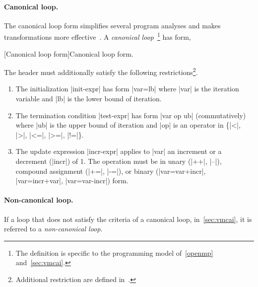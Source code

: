 \paragraph*{Canonical loop.}
The canonical loop form simplifies several program analyses and makes transformations more effective~\cite{llvm_loops}.
A \emph{canonical loop}~\cite[p. 196--202]{openmp_api}\footnote{
The definition is specific to the programming model of~\autoref{openmp} and~\autoref{sec:vmcai}.} has form,
\begin{center}
\begin{minipage}{\textwidth}
[Canonical loop form]{Canonical loop form.}
\label{lst:canonical}
\end{minipage}
\end{center}
The header must additionally satisfy the following restrictions\footnote{
Additional restriction are defined in~\cite[p. 201]{openmp_api}.}.
\begin{enumerate}
\item The initialization \pr|init-expr| has form \pr|var=lb| where \pr|var| is the iteration variable and \pr|lb| is the lower bound of iteration.
\item The termination condition \pr|test-expr| has form \pr|var op ub| (commutatively)
    where \pr|ub| is the upper bound of iteration and \pr|op| is an operator in \{\pr|<|, \pr|>|, \pr|<=|, \pr|>=|, \pr|!=|\}.
\item The update expression \pr|incr-expr| applies to \pr|var| an increment or a decrement (\pr|incr|) of 1.
The operation must be in unary (\pr|++|, \pr|--|), compound assignment (\pr|+=|, \pr|-=|), or
binary (\pr|var=var+incr|, \pr|var=incr+var|, \pr|var=var-incr|) form.
\end{enumerate}

\paragraph*{Non-canonical loop.}
If a loop that does not satisfy the criteria of a canonical loop, in~\autoref{sec:vmcai}, it is referred to a \emph{non-canonical loop}.

